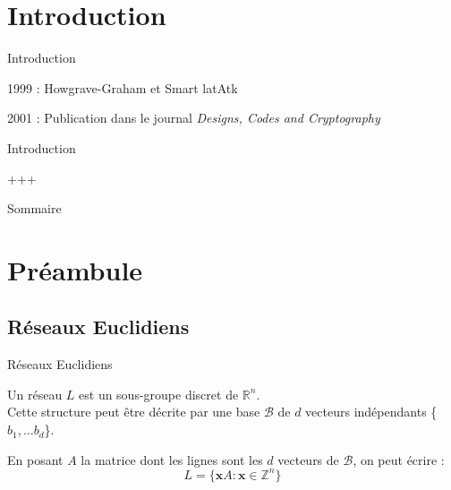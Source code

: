 \documentclass{backend/backend}
\begin{document}
\begin{frame}
    \titlepage
\end{frame}

\section*{Introduction}
\showtoctrue %

\begin{frame}{Introduction}
    
    \begin{block}{1999 : Howgrave-Graham et Smart }
        latAtk
    \end{block}

    2001 : Publication dans le journal \textit{Designs, Codes and Cryptography}
    
\end{frame}

\begin{frame}{Introduction}
    
   +++
\end{frame}

\begin{frame}{Sommaire}

        \small
        \tableofcontents

\end{frame}



\section{Préambule} %
\subsection{Réseaux Euclidiens}

\begin{frame}{Réseaux Euclidiens}
    
    
    Un réseau $L$ est un sous-groupe discret de $\mathbb{R}^n$.\\
    
    Cette structure peut être décrite par une base $\mathcal{B}$ de $d$ vecteurs indépendants \{$b_1, \dots b_d$\}.
    
    
    En posant $A$ la matrice dont les lignes sont les $d$ vecteurs de $\mathcal{B}$, on peut écrire :
    $$L = \{\mathbf{x}A : \mathbf{x} \in \mathbb{Z}^n\}$$
\end{frame}
\end{document}
